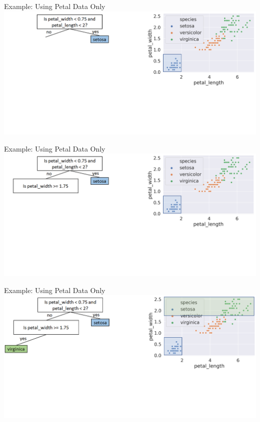 \documentclass[aspectratio=169]{../latex_main/tntbeamer}  %
\begin{document}
	
	\begin{frame}{Example: Using Petal Data Only}
	        \includegraphics[scale=.34]{Bild7}
	\end{frame}
	
	
	\begin{frame}{Example: Using Petal Data Only}
	        \includegraphics[scale=.34]{Bild8}
	\end{frame}
	
	
	\begin{frame}{Example: Using Petal Data Only}
	        \includegraphics[scale=.34]{Bild9}
	\end{frame}
	
\end{document}
